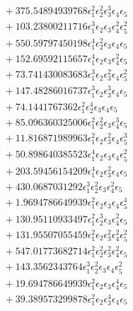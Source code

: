 \documentclass[10pt]{article}
\begin{document}
\begin{align*}
&{}  + 375.54894939768 \epsilon_{1}^{2} \epsilon_{2}^{2} \epsilon_{3}^{3} \epsilon_{4} \epsilon_{5} \\
&{}  + 103.23800211716 \epsilon_{1}^{3} \epsilon_{2} \epsilon_{3} \epsilon_{4}^{2} \epsilon_{5}^{2} \\
&{}  + 550.59797450198 \epsilon_{1}^{4} \epsilon_{2}^{2} \epsilon_{3} \epsilon_{4} \epsilon_{5} \\
&{}  + 152.69592115657 \epsilon_{1}^{4} \epsilon_{2} \epsilon_{3} \epsilon_{4}^{2} \epsilon_{5} \\
&{}  + 73.741430083683 \epsilon_{1}^{3} \epsilon_{2} \epsilon_{3}^{2} \epsilon_{4} \epsilon_{5}^{2} \\
&{}  + 147.48286016737 \epsilon_{1}^{3} \epsilon_{2} \epsilon_{3}^{3} \epsilon_{4} \epsilon_{5} \\
&{}  + 74.1441767362 \epsilon_{1}^{2} \epsilon_{2}^{4} \epsilon_{3} \epsilon_{4} \epsilon_{5} \\
&{}  + 85.096360325006 \epsilon_{1}^{2} \epsilon_{2}^{2} \epsilon_{3} \epsilon_{4}^{3} \epsilon_{5} \\
&{}  + 11.816871989963 \epsilon_{1}^{2} \epsilon_{2} \epsilon_{3}^{2} \epsilon_{4} \epsilon_{5}^{3} \\
&{}  + 50.898640385523 \epsilon_{1}^{4} \epsilon_{2} \epsilon_{3} \epsilon_{4} \epsilon_{5}^{2} \\
&{}  + 203.59456154209 \epsilon_{1}^{4} \epsilon_{2} \epsilon_{3}^{2} \epsilon_{4} \epsilon_{5} \\
&{}  + 430.0687031292 \epsilon_{1}^{3} \epsilon_{2}^{2} \epsilon_{3} \epsilon_{4}^{2} \epsilon_{5} \\
&{}  + 1.9694786649939 \epsilon_{1}^{2} \epsilon_{2} \epsilon_{3} \epsilon_{4} \epsilon_{5}^{4} \\
&{}  + 130.95110933497 \epsilon_{1}^{2} \epsilon_{2}^{3} \epsilon_{3} \epsilon_{4}^{2} \epsilon_{5} \\
&{}  + 131.95507055459 \epsilon_{1}^{2} \epsilon_{2} \epsilon_{3}^{2} \epsilon_{4}^{2} \epsilon_{5}^{2} \\
&{}  + 547.01773682714 \epsilon_{1}^{2} \epsilon_{2}^{2} \epsilon_{3}^{2} \epsilon_{4}^{2} \epsilon_{5} \\
&{}  + 143.3562343764 \epsilon_{1}^{3} \epsilon_{2}^{2} \epsilon_{3} \epsilon_{4} \epsilon_{5}^{2} \\
&{}  + 19.694786649939 \epsilon_{1}^{2} \epsilon_{2} \epsilon_{3} \epsilon_{4}^{4} \epsilon_{5} \\
&{}  + 39.389573299878 \epsilon_{1}^{2} \epsilon_{2} \epsilon_{3}^{4} \epsilon_{4} \epsilon_{5} \\

\end{align*}
\end{document}
